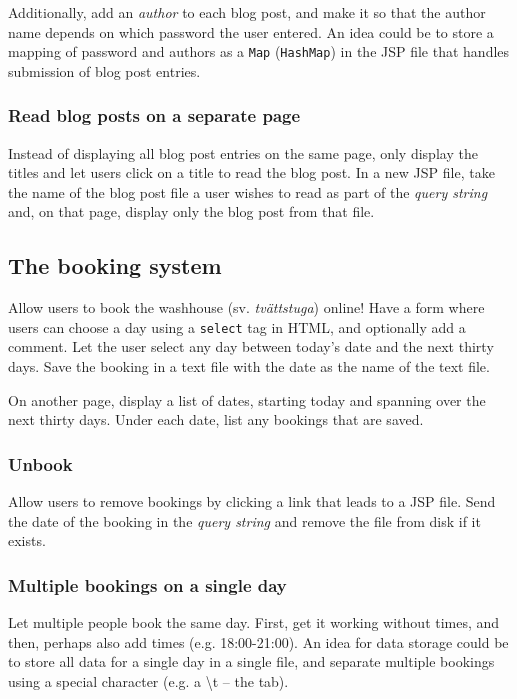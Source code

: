 \documentclass[a4paper, english]{article}
\begin{document}
                Additionally, add an \emph{author} to each blog post, and make it so that the author name depends on which password the user entered. An idea could be to store a mapping of password and authors as a \texttt{Map} (\texttt{HashMap}) in the JSP file that handles submission of blog post entries.
            
            \subsubsection*{Read blog posts on a separate page}
                Instead of displaying all blog post entries on the same page, only display the titles and let users click on a title to read the blog post. In a new JSP file, take the name of the blog post file a user wishes to read as part of the \emph{query string} and, on that page, display only the blog post from that file.
        
        \subsection*{The booking system}
            Allow users to book the washhouse (sv. \emph{tvättstuga}) online! Have a form where users can choose a day using a \texttt{select} tag in HTML, and optionally add a comment. Let the user select any day between today's date and the next thirty days. Save the booking in a text file with the date as the name of the text file.
            
            On another page, display a list of dates, starting today and spanning over the next thirty days. Under each date, list any bookings that are saved.
            
            \subsubsection*{Unbook}
                Allow users to remove bookings by clicking a link that leads to a JSP file. Send the date of the booking in the \emph{query string} and remove the file from disk if it exists.
            
            \subsubsection*{Multiple bookings on a single day}
                Let multiple people book the same day. First, get it working without times, and then, perhaps also add times (e.g. 18:00-21:00). An idea for data storage could be to store all data for a single day in a single file, and separate multiple bookings using a special character (e.g. a \textbackslash t -- the tab).
    
\end{document}
